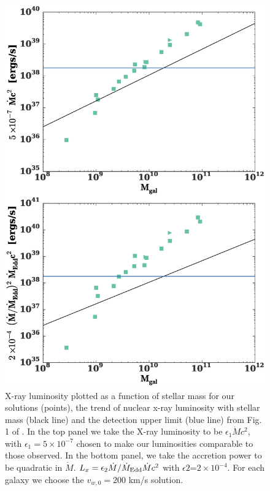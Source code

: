\documentclass[usenatbib,fleqn]{mn2e}
\newcommand{\Mdot}{\dot{M}}
\newcommand{\eddr}{\dot{M}/\dot{M}_{\rm Edd}}
\newcommand{\vwO}{v_{w,0}}
\begin{document}
\begin{figure}
\includegraphics[width=\columnwidth]{bh_xray.eps}
\caption{\label{fig:bh_xray} X-ray luminosity plotted as a function of
  stellar mass for our solutions (points), the trend of nuclear x-ray
  luminosity with stellar mass (black line) and the detection upper
  limit (blue line) from Fig. 1 of \citealt{MillerGallo+:2014a}. In
  the top panel we take the X-ray luminosity to be $\epsilon_1 \Mdot
  c^2$, with $\epsilon_1=5\times 10^{-7}$ chosen to make our
  luminosities comparable to those observed. In the bottom panel, we
  take the accretion power to be quadratic in $\Mdot$. $L_x=\epsilon_2
  \eddr \Mdot c^2$ with $\epsilon2$=$2\times10^{-4}$. For each galaxy
  we choose the $\vwO=200$ km/s solution.}
\end{figure}
\end{document}
